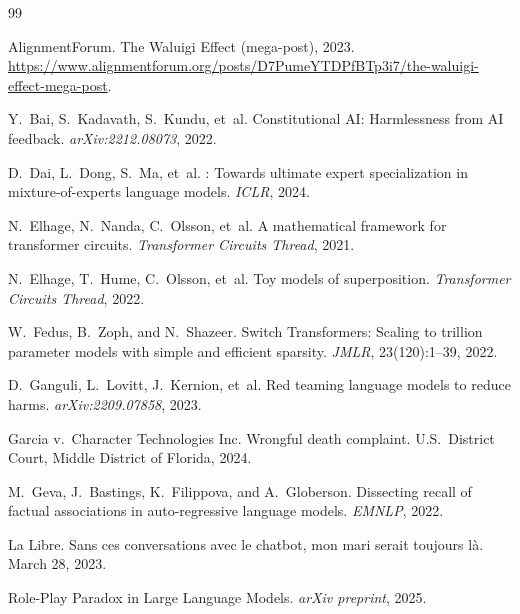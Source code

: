 \documentclass[11pt,a4paper]{article}
\begin{document}
\begin{thebibliography}{99}

AlignmentForum.
\newblock The {W}aluigi {E}ffect (mega-post), 2023.
\newblock \url{https://www.alignmentforum.org/posts/D7PumeYTDPfBTp3i7/the-waluigi-effect-mega-post}.

Y.~Bai, S.~Kadavath, S.~Kundu, et~al.
\newblock Constitutional {AI}: Harmlessness from {AI} feedback.
\newblock \emph{arXiv:2212.08073}, 2022.

D.~Dai, L.~Dong, S.~Ma, et~al.
: Towards ultimate expert specialization in mixture-of-experts language models.
\newblock \emph{ICLR}, 2024.

N.~Elhage, N.~Nanda, C.~Olsson, et~al.
\newblock A mathematical framework for transformer circuits.
\newblock \emph{Transformer Circuits Thread}, 2021.

N.~Elhage, T.~Hume, C.~Olsson, et~al.
\newblock Toy models of superposition.
\newblock \emph{Transformer Circuits Thread}, 2022.

W.~Fedus, B.~Zoph, and N.~Shazeer.
\newblock Switch {T}ransformers: Scaling to trillion parameter models with simple and efficient sparsity.
\newblock \emph{JMLR}, 23(120):1--39, 2022.

D.~Ganguli, L.~Lovitt, J.~Kernion, et~al.
\newblock Red teaming language models to reduce harms.
\newblock \emph{arXiv:2209.07858}, 2023.

{Garcia v.\ Character Technologies Inc.}
\newblock Wrongful death complaint.
\newblock U.S.\ District Court, Middle District of Florida, 2024.

M.~Geva, J.~Bastings, K.~Filippova, and A.~Globerson.
\newblock Dissecting recall of factual associations in auto-regressive language models.
\newblock \emph{EMNLP}, 2022.

{La Libre}.
\newblock Sans ces conversations avec le chatbot, mon mari serait toujours l\`{a}.
\newblock March 28, 2023.

{Role-Play Paradox in Large Language Models}.
\newblock \emph{arXiv preprint}, 2025.


\end{thebibliography}
\end{document}
